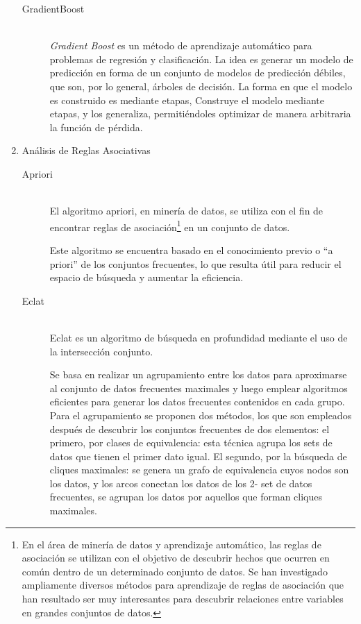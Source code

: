 \begin{enumerate}
\begin{description}
      \item[GradientBoost] \hfill \\
      \textit{Gradient Boost} es un método de aprendizaje automático para problemas de regresión y clasificación. La idea es generar un modelo de predicción en forma de un conjunto de modelos de predicción débiles, que son, por lo general, árboles de decisión. La forma en que el modelo es construido es mediante etapas, Construye el modelo mediante etapas, y los generaliza, permitiéndoles optimizar de manera arbitraria la función de pérdida.
      
    \end{description}
    
    
  \item Análisis de Reglas Asociativas
    \begin{description}
    
      \item[Apriori] \hfill \\
      El algoritmo apriori, en minería de datos, se utiliza con el fin de encontrar reglas de asociación\footnote{En el área de minería de datos y aprendizaje automático, las reglas de asociación se utilizan con el objetivo de descubrir hechos que ocurren en común dentro de un determinado conjunto de datos. Se han investigado ampliamente diversos métodos para aprendizaje de reglas de asociación que han resultado ser muy interesantes para descubrir relaciones entre variables en grandes conjuntos de datos.} en un conjunto de datos. 
      
      Este algoritmo se encuentra basado en el conocimiento previo o “a priori” de los conjuntos frecuentes, lo que resulta útil para reducir el espacio de búsqueda y aumentar la eficiencia.
      
      \item[Eclat] \hfill \\
      Eclat es un algoritmo de búsqueda en profundidad mediante el uso de la intersección conjunto.
      
      Se basa en realizar un agrupamiento entre los datos para aproximarse al conjunto de datos frecuentes maximales y luego emplear algoritmos eficientes para generar los datos frecuentes contenidos en cada grupo. Para el agrupamiento se proponen dos métodos, los que son empleados después de descubrir los conjuntos frecuentes de dos elementos: el primero, por clases de equivalencia: esta técnica agrupa los sets de datos que tienen el primer dato igual. El segundo, por la búsqueda de cliques maximales: se genera un grafo de equivalencia cuyos nodos son los datos, y los arcos conectan los datos de los 2- set de datos frecuentes, se agrupan los datos por aquellos que forman cliques maximales.
      

\end{description}
\end{enumerate}

